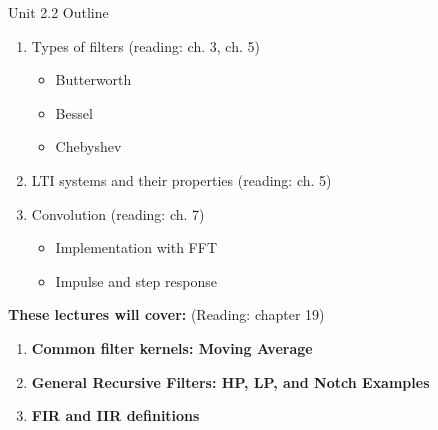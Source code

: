 \documentclass{beamer}
\begin{document}
\begin{frame}{Unit 2.2 Outline}
\begin{enumerate}
\item Types of filters (reading: ch. 3, ch. 5)
\begin{itemize}
\item Butterworth
\item Bessel
\item Chebyshev
\end{itemize}
\item LTI systems and their properties (reading: ch. 5)
\item Convolution (reading: ch. 7)
\begin{itemize}
\item Implementation with FFT
\item Impulse and step response
\end{itemize}
\end{enumerate}
\textbf{These lectures will cover:} (Reading: chapter 19)
\begin{enumerate}
\item \textbf{Common filter kernels: Moving Average}
\item \textbf{General Recursive Filters: HP, LP, and Notch Examples}
\item \textbf{FIR and IIR definitions}
\end{enumerate}
\end{frame}
\end{document}
